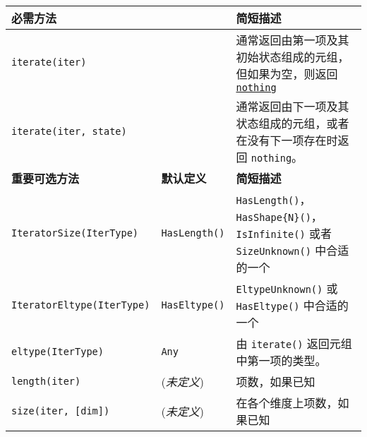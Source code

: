 
\begin{table}[h] 
  \centering 
  \textwidth
  \textwidth
\begin{tabulary}{\linewidth}{LLL}
  \toprule
  \textbf{必需方法} &  & \textbf{简短描述} \\
  \midrule
  
  \texttt{iterate(iter)} &  & 通常返回由第一项及其初始状态组成的元组，但如果为空，则返回 \hyperlink{9331422207248206047}{\texttt{nothing}} \\ \midrule
  \texttt{iterate(iter, state)} &  & 通常返回由下一项及其状态组成的元组，或者在没有下一项存在时返回 \texttt{nothing}。 \\ 
  
  \toprule
  \textbf{重要可选方法} & \textbf{默认定义} & \textbf{简短描述} \\ \midrule
  \texttt{IteratorSize(IterType)} & \texttt{HasLength()} & \texttt{HasLength()}，\texttt{HasShape\{N\}()}，\texttt{IsInfinite()} 或者 \texttt{SizeUnknown()} 中合适的一个 \\ \midrule
  \texttt{IteratorEltype(IterType)} & \texttt{HasEltype()} & \texttt{EltypeUnknown()} 或 \texttt{HasEltype()} 中合适的一个 \\ \midrule
  \texttt{eltype(IterType)} & \texttt{Any} & 由 \texttt{iterate()} 返回元组中第一项的类型。 \\ \midrule
  \texttt{length(iter)} & (\emph{未定义}) & 项数，如果已知 \\ \midrule
  \texttt{size(iter, [dim])} & (\emph{未定义}) & 在各个维度上项数，如果已知 \\
  \bottomrule
\end{tabulary}
\end{table}

